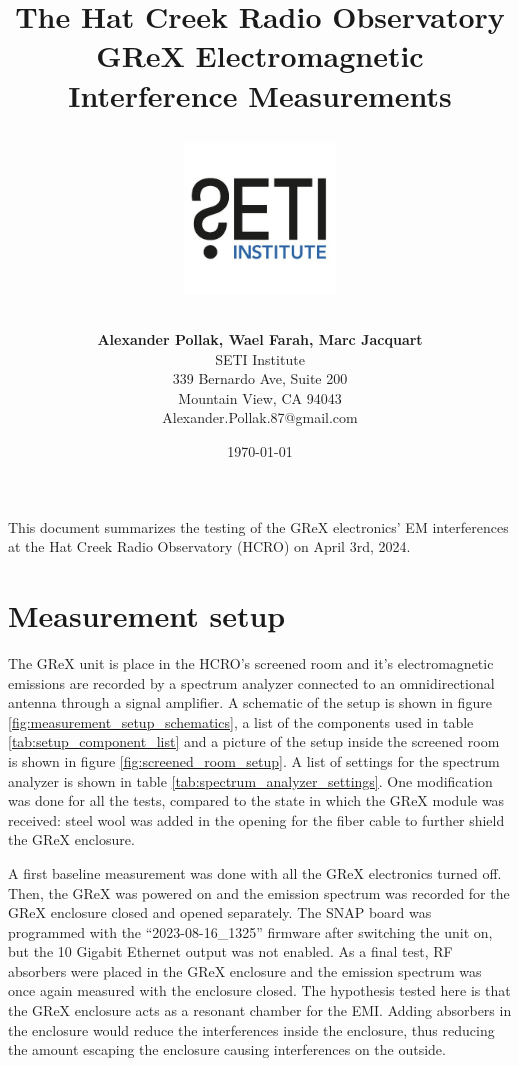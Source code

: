 \documentclass[12pt,a4paper,oneside]{article}
\title{\Huge The Hat Creek Radio Observatory\\
\vspace{0.5cm}
GReX Electromagnetic Interference Measurements\\
\vspace{0.5cm}
\normalsize \emph{}
\vspace{3.5cm}
\begin{center}
\includegraphics[height=4cm]{Figures/SETI_institute_logo.jpg}
\end{center}
}
\author{ 
\vspace{1cm}
\Large
\textbf{Alexander Pollak, Wael Farah, Marc Jacquart} \\
SETI Institute \\ 
339 Bernardo Ave, Suite 200 \\
Mountain View, CA 94043 \\ 
Alexander.Pollak.87@gmail.com\\
}
\date{\today}
\begin{document}
\clearpage\maketitle
\thispagestyle{empty}

\newpage


This document summarizes the testing of the GReX electronics' EM interferences at the Hat Creek Radio Observatory (HCRO) on April 3rd, 2024.

\section{Measurement setup}
\label{sec:Testing}

The GReX unit is place in the HCRO's screened room and it's electromagnetic emissions are recorded by a spectrum analyzer connected to an omnidirectional antenna through a signal amplifier. A schematic of the setup is shown in figure \ref{fig:measurement_setup_schematics}, a list of the components used in table \ref{tab:setup_component_list} and a picture of the setup inside the screened room is shown in figure \ref{fig:screened_room_setup}. A list of settings for the spectrum analyzer is shown in table \ref{tab:spectrum_analyzer_settings}. One modification was done for all the tests, compared to the state in which the GReX module was received: steel wool was added in the opening for the fiber cable to further shield the GReX enclosure.

A first baseline measurement was done with all the GReX electronics turned off. Then, the GReX was powered on and the emission spectrum was recorded for the GReX enclosure closed and opened separately. The SNAP board was programmed with the ``2023-08-16\_1325'' firmware after switching the unit on, but the 10 Gigabit Ethernet output was not enabled. As a final test, RF absorbers were placed in the GReX enclosure and the emission spectrum was once again measured with the enclosure closed. The hypothesis tested here is that the GReX enclosure acts as a resonant chamber for the EMI. Adding absorbers in the enclosure would reduce the interferences inside the enclosure, thus reducing the amount escaping the enclosure causing interferences on the outside.
\end{document}
